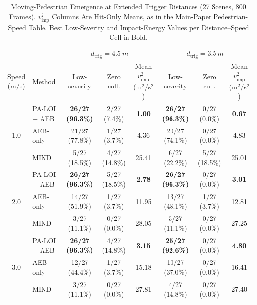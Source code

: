 \begin{table}[!ht]
\caption{Moving-Pedestrian Emergence at Extended Trigger Distances (27 Scenes, 800 Frames). $v_{\mathrm{imp}}^2$ Columns Are Hit-Only Means, as in the Main-Paper Pedestrian-Speed Table. Best Low-Severity and Impact-Energy Values per Distance--Speed Cell in Bold.}
\label{tab:extended-distance}
\centering
\scriptsize
\setlength{\tabcolsep}{4.5pt}
\begin{tabular}{clcccccc}
\toprule
 & & \multicolumn{3}{c}{$d_{\mathrm{trig}}=\SI{4.5}{m}$} & \multicolumn{3}{c}{$d_{\mathrm{trig}}=\SI{3.5}{m}$} \\
\cmidrule(lr){3-5}\cmidrule(lr){6-8}
\makecell{Speed\\(m/s)} & Method & Low-severity & Zero coll. & \makecell{Mean $v_{\mathrm{imp}}^2$\\(m$^2$/s$^2$)} & Low-severity & Zero coll. & \makecell{Mean $v_{\mathrm{imp}}^2$\\(m$^2$/s$^2$)} \\
\midrule
\multirow{3}{*}{1.0} & PA-LOI + AEB & \textbf{26/27 (96.3\%)} & 2/27 (7.4\%) & \textbf{1.00} & \textbf{26/27 (96.3\%)} & 0/27 (0.0\%) & \textbf{0.67} \\
 & AEB-only & 21/27 (77.8\%) & 1/27 (3.7\%) & 4.36 & 20/27 (74.1\%) & 0/27 (0.0\%) & 4.83 \\
 & MIND & 5/27 (18.5\%) & 4/27 (14.8\%) & 25.41 & 6/27 (22.2\%) & 5/27 (18.5\%) & 25.01 \\
\midrule
\multirow{3}{*}{2.0} & PA-LOI + AEB & \textbf{26/27 (96.3\%)} & 5/27 (18.5\%) & \textbf{2.78} & \textbf{26/27 (96.3\%)} & 0/27 (0.0\%) & \textbf{3.01} \\
 & AEB-only & 14/27 (51.9\%) & 1/27 (3.7\%) & 11.95 & 13/27 (48.1\%) & 1/27 (3.7\%) & 12.81 \\
 & MIND & 3/27 (11.1\%) & 0/27 (0.0\%) & 28.05 & 3/27 (11.1\%) & 0/27 (0.0\%) & 27.25 \\
\midrule
\multirow{3}{*}{3.0} & PA-LOI + AEB & \textbf{26/27 (96.3\%)} & 4/27 (14.8\%) & \textbf{3.15} & \textbf{25/27 (92.6\%)} & 0/27 (0.0\%) & \textbf{4.80} \\
 & AEB-only & 12/27 (44.4\%) & 1/27 (3.7\%) & 15.18 & 10/27 (37.0\%) & 0/27 (0.0\%) & 16.41 \\
 & MIND & 3/27 (11.1\%) & 0/27 (0.0\%) & 27.81 & 4/27 (14.8\%) & 0/27 (0.0\%) & 27.40 \\
\bottomrule
\end{tabular}

\vspace{2pt}{\scriptsize In one scene AEB-only hits replay background traffic before the trigger in all six cells (counted unsafe); excluding that scene for all stacks changes no rate by more than 3.1\,pp and no ordering.}
\end{table}
